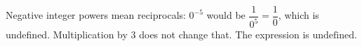 Negative integer powers mean reciprocals: $0^{-5}$ would be $\dfrac{1}{0^5}=\dfrac{1}{0}$, which is undefined. Multiplication by 3 does not change that. The expression is $\boxed{\text{undefined}}$.
